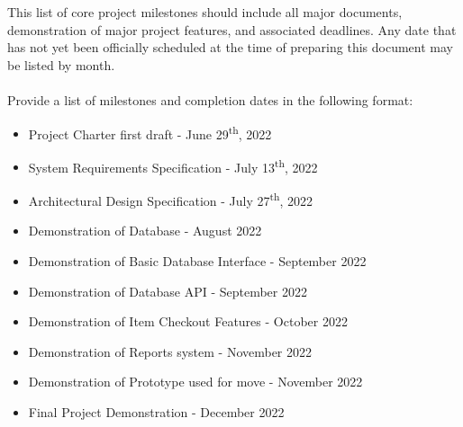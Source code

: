 This list of core project milestones should include all major documents, demonstration of major project features, and associated deadlines. Any date that has not yet been officially scheduled at the time of preparing this document may be listed by month.
\\
\\
Provide a list of milestones and completion dates in the following format:
\begin{itemize}
  \item Project Charter first draft - June 29\textsuperscript{th}, 2022
  \item System Requirements Specification - July 13\textsuperscript{th}, 2022
  \item Architectural Design Specification - July 27\textsuperscript{th}, 2022
  \item Demonstration of Database - August 2022
  \item Demonstration of Basic Database Interface  - September 2022
  \item Demonstration of Database API - September 2022
  \item Demonstration of Item Checkout Features - October 2022
  \item Demonstration of Reports system  - November 2022
  \item Demonstration of Prototype used for move - November 2022
  \item Final Project Demonstration - December 2022
\end{itemize}